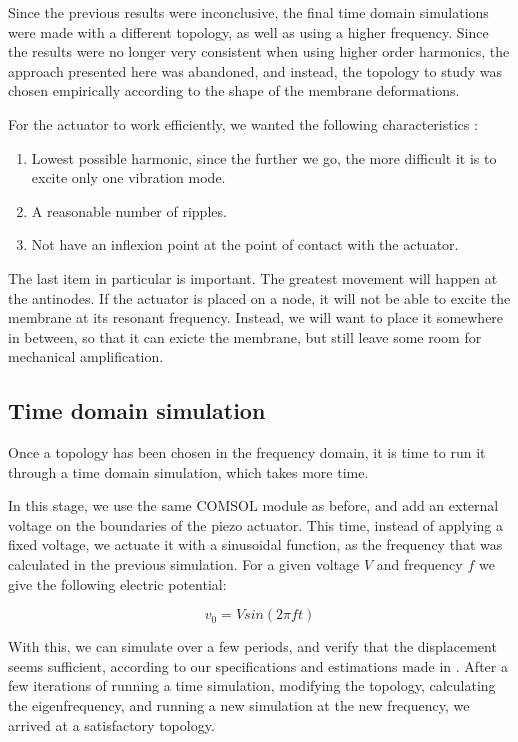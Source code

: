 
Since the previous results were inconclusive, the final time domain simulations
were made with a different topology, as well as using a higher frequency. Since
the results were no longer very consistent when using higher order harmonics,
the approach presented here was abandoned, and instead, the topology to study
was chosen empirically according to the shape of the membrane deformations.

For the actuator to work efficiently, we wanted the following characteristics :
\begin{enumerate}
  \item Lowest possible harmonic, since the further we go, the more difficult it
    is to excite only one vibration mode.
  \item A reasonable number of ripples.
  \item Not have an inflexion point at the point of contact with the actuator.
\end{enumerate}

The last item in particular is important. The greatest movement will happen at
the antinodes. If the actuator is placed on a node, it will not be able to
excite the membrane at its resonant frequency. Instead, we will want to place it
somewhere in between, so that it can exicte the membrane, but still leave some
room for mechanical amplification.

\subsection{Time domain simulation}

Once a topology has been chosen in the frequency domain, it is time to run it
through a time domain simulation, which takes more time.

In this stage, we use the same COMSOL module as before, and add an external
voltage on the boundaries of the piezo actuator. This time, instead of applying
a fixed voltage, we actuate it with a sinusoidal function, as the frequency that
was calculated in the previous simulation. For a given voltage $V$ and frequency
$f$ we give the following electric potential:

\begin{equation}
  v_0 = V sin(2\pi f t)
  \label{eq:v0}
\end{equation}

With this, we can simulate over a few periods, and verify that the displacement
seems sufficient, according to our specifications and estimations made in
. After a few iterations of running a time simulation,
modifying the topology, calculating the eigenfrequency, and running a new
simulation at the new frequency, we arrived at a satisfactory topology.

